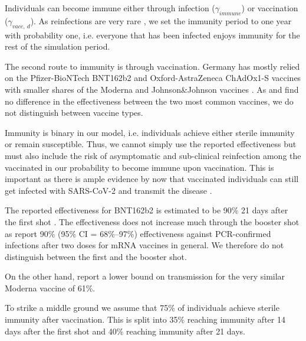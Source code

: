 
Individuals can become immune either through infection ($\gamma_{immune}$) or vaccination
($\gamma_{vacc,\:d}$). As reinfections are very rare \citep{AbuRaddad2020}, we
set the immunity period to one year with probability one, i.e. everyone that has
been infected enjoys immunity for the rest of the simulation period.

\label{r.2.c}
The second route to immunity is through vaccination. Germany has mostly relied on the
Pfizer-BioNTech BNT162b2 and Oxford-AstraZeneca ChAdOx1-S vaccines with smaller shares of
the Moderna and Johnson\&Johnson vaccines \citep{Impfdashboard}. As \citet{Pritchard2021}
and \citet{Harris2021} find no difference in the effectiveness between the two most
common vaccines, we do not distinguish between vaccine types.

Immunity is binary in our model, i.e. individuals achieve either sterile immunity or
remain susceptible. Thus, we cannot simply use the reported effectiveness but must also
include the risk of asymptomatic and sub-clinical reinfection among the vaccinated in our
probability to become immune upon vaccination. This is important as there is ample
evidence by now that vaccinated individuals can still get infected with SARS-CoV-2 and
transmit the disease \citep{Petter2021, LevineTiefenbrun2021, Harris2021}.

The reported effectiveness for BNT162b2 is estimated to be 90\% 21 days after the first
shot \citep{Hunter2021}. The effectiveness does not increase much through the booster
shot as \citet{Thompson2021} report 90\% (95\% CI = 68\%–97\%) effectiveness against
PCR-confirmed infections after two doses for mRNA vaccines in general. We therefore do
not distinguish between the first and the booster shot.

On the other hand, \citet{Lipsitch2021} report a lower bound on transmission for
the very similar Moderna vaccine of 61\%.

To strike a middle ground we assume that 75\% of individuals achieve sterile immunity
after vaccination. This is split into 35\% reaching immunity after 14 days after the
first shot and 40\% reaching immunity after 21 days.

\FloatBarrier
